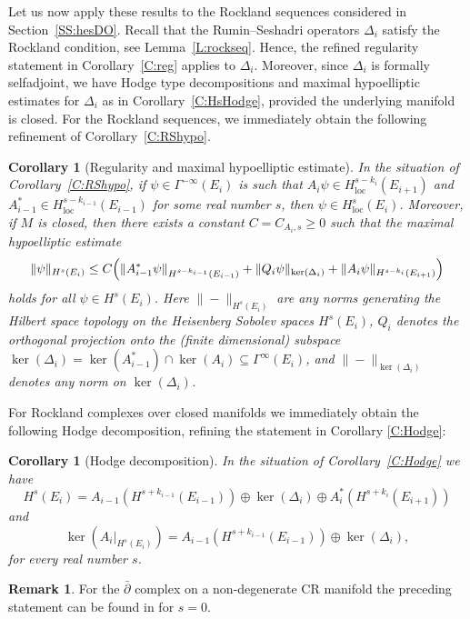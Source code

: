 \documentclass[reqno,12pt]{amsart}
\newcommand\loc{\textrm{loc}}
\theoremstyle{plain}
\newtheorem{corollary}[theorem]{Corollary}
\theoremstyle{definition}
\newtheorem{remark}[theorem]{Remark}
\begin{document}
Let us now apply these results to the Rockland sequences considered in Section~\ref{SS:hesDO}.
Recall that the Rumin--Seshadri operators $\Delta_i$ satisfy the Rockland condition, see Lemma~\ref{L:rockseq}.
Hence, the refined regularity statement in Corollary~\ref{C:reg} applies to $\Delta_i$.
Moreover, since $\Delta_i$ is formally selfadjoint, we have Hodge type decompositions and maximal hypoelliptic estimates for $\Delta_i$ as in Corollary~\ref{C:HsHodge}, provided the underlying manifold is closed.
For the Rockland sequences, we immediately obtain the following refinement of Corollary~\ref{C:RShypo}.


\begin{corollary}[Regularity and maximal hypoelliptic estimate]\label{C:regrockseq}
In the situation of Corollary~\ref{C:RShypo}, if $\psi\in\Gamma^{-\infty}(E_i)$ is such that $A_i\psi\in H_\loc^{s-k_i}(E_{i+1})$ and $A_{i-1}^*\in H_\loc^{s-k_{i-1}}(E_{i-1})$ for some real number $s$, then $\psi\in H^s_\loc(E_i)$.
Moreover, if $M$ is closed, then there exists a constant $C=C_{A_i,s}\geq0$ such that the maximal hypoelliptic estimate
$$
\|\psi\|_{H^s(E_i)}\leq C\Bigl(\|A_{i-1}^*\psi\|_{H^{s-k_{i-1}}(E_{i-1})}+\|Q_i\psi\|_{\ker(\Delta_i)}+\|A_i\psi\|_{H^{s-k_i}(E_{i+1})}\Bigr)
$$
holds for all $\psi\in H^s(E_i)$.
Here $\|-\|_{H^s(E_i)}$ are any norms generating the Hilbert space topology on the Heisenberg Sobolev spaces $H^s(E_i)$, $Q_i$ denotes the orthogonal projection onto the (finite dimensional) subspace $\ker(\Delta_i)=\ker(A_{i-1}^*)\cap\ker(A_i)\subseteq\Gamma^\infty(E_i)$, and $\|-\|_{\ker(\Delta_i)}$ denotes any norm on $\ker(\Delta_i)$.
\end{corollary}


For Rockland complexes over closed manifolds we immediately obtain the following Hodge decomposition, refining the statement in Corollary \ref{C:Hodge}:


\begin{corollary}[Hodge decomposition]\label{C:HsHodge-seq}
In the situation of Corollary~\ref{C:Hodge} we have
$$
H^s(E_i)=A_{i-1}(H^{s+k_{i-1}}(E_{i-1}))\oplus\ker(\Delta_i)\oplus A_i^*(H^{s+k_i}(E_{i+1}))
$$
and
$$
\ker(A_i|_{H^s(E_i)})=A_{i-1}(H^{s+k_{i-1}}(E_{i-1}))\oplus\ker(\Delta_i),
$$
for every real number $s$.
\end{corollary}


\begin{remark}
For the $\bar\partial$ complex on a non-degenerate CR manifold the preceding statement can be found in \cite[Theorem~17.1]{FS74} for $s=0$.
\end{remark}
\end{document}
